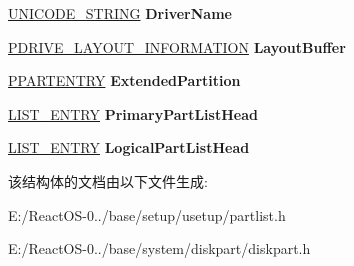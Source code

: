 \begin{DoxyCompactItemize}
\hyperlink{struct___u_n_i_c_o_d_e___s_t_r_i_n_g}{U\+N\+I\+C\+O\+D\+E\+\_\+\+S\+T\+R\+I\+NG} {\bfseries Driver\+Name}
\item 
\mbox{\label{struct___d_i_s_k_e_n_t_r_y_aeeea0244af92feb29ce9007cb8340d61}} 
\hyperlink{struct___d_r_i_v_e___l_a_y_o_u_t___i_n_f_o_r_m_a_t_i_o_n}{P\+D\+R\+I\+V\+E\+\_\+\+L\+A\+Y\+O\+U\+T\+\_\+\+I\+N\+F\+O\+R\+M\+A\+T\+I\+ON} {\bfseries Layout\+Buffer}
\item 
\mbox{\label{struct___d_i_s_k_e_n_t_r_y_a4cf992d3f5f66f4d1611350a9bff9236}} 
\hyperlink{struct___p_a_r_t_e_n_t_r_y}{P\+P\+A\+R\+T\+E\+N\+T\+RY} {\bfseries Extended\+Partition}
\item 
\mbox{\label{struct___d_i_s_k_e_n_t_r_y_add2aa8250a73bedcb15f8fdd83ad49b4}} 
\hyperlink{struct___l_i_s_t___e_n_t_r_y}{L\+I\+S\+T\+\_\+\+E\+N\+T\+RY} {\bfseries Primary\+Part\+List\+Head}
\item 
\mbox{\label{struct___d_i_s_k_e_n_t_r_y_a51d18c4350cc71d8139a5be0695d0d17}} 
\hyperlink{struct___l_i_s_t___e_n_t_r_y}{L\+I\+S\+T\+\_\+\+E\+N\+T\+RY} {\bfseries Logical\+Part\+List\+Head}
\end{DoxyCompactItemize}


该结构体的文档由以下文件生成\+:\begin{DoxyCompactItemize}
\item 
E\+:/\+React\+O\+S-\/0../base/setup/usetup/partlist.\+h\item 
E\+:/\+React\+O\+S-\/0../base/system/diskpart/diskpart.\+h\end{DoxyCompactItemize}
